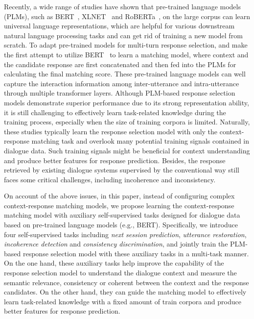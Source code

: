 \documentclass{article}
\begin{document}
Recently, a wide range of studies have shown that pre-trained language models (PLMs), such as BERT~\cite{devlin-etal-2019-bert}, XLNET~\cite{yang2019xlnet} and RoBERTa~\cite{liu2019roberta}, on the large corpus can learn universal language representations, which are helpful for various downstream natural language processing tasks and can get rid of training a new model from scratch.
To adapt pre-trained models for multi-turn response selection, \citet{whang2020domain} and \citet{gu2020speaker} make the first attempt to  utilize BERT~\cite{devlin-etal-2019-bert} to learn a matching model, where context and the candidate response are first concatenated and then fed into the PLMs for calculating the final matching score. 
These pre-trained language models can well capture the interaction information among inter-utterance and intra-utterance through multiple transformer layers.
Although PLM-based response selection models demonstrate superior performance due to its strong representation ability, it is still challenging to effectively learn task-related knowledge during the training process, especially when the size of training corpora is limited.
Naturally, these studies typically 
learn the response selection model with only the context-response matching task
and overlook many potential training signals 
contained in dialogue data. Such training signals might  be  beneficial  for  context  understanding  and  produce better  features  for  response  prediction. 
Besides, the response retrieved by existing dialogue systems supervised by the conventional way still faces some critical challenges, including  incoherence  and  inconsistency. 



On account of the above issues, in this paper, instead of configuring complex context-response matching models,
we propose learning the context-response matching model with auxiliary self-supervised tasks designed for dialogue data based on pre-trained language models (e.g., BERT).
Specifically, we introduce four self-supervised tasks  including  \emph{next session prediction}, \emph{utterance restoration}, \emph{incoherence  detection} and \emph{consistency  discrimination}, and  jointly  train  the  PLM-based  response  selection  model with  these  auxiliary  tasks  in  a  multi-task  manner. 
On the one hand, these auxiliary tasks help improve the capability of the response selection model to understand the dialogue context and measure the semantic relevance, consistency or coherent between the context and the response candidates. On the other hand, they can guide the matching model to effectively learn task-related knowledge with a fixed amount of train corpora and produce better features for response prediction. 
\end{document}
